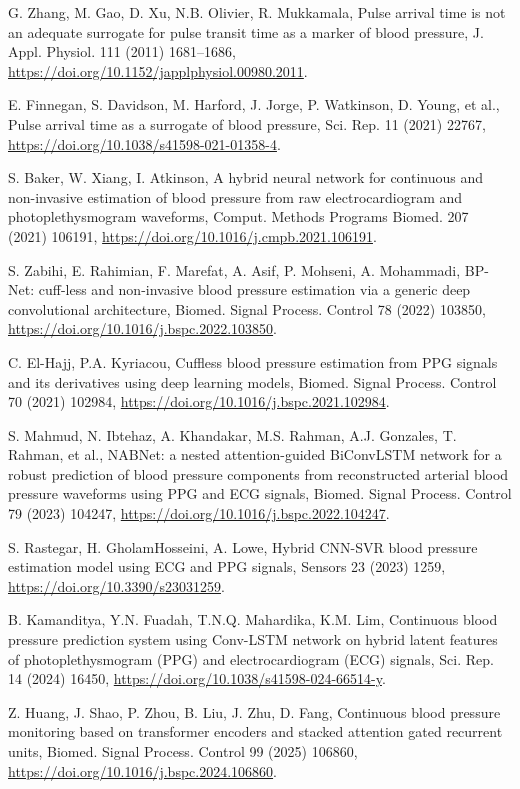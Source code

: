 \documentclass[preprint,12pt]{elsarticle}
\begin{document}
\begin{enumerate}[label={[\arabic*]},leftmargin=2.2em]
\item G. Zhang, M. Gao, D. Xu, N.B. Olivier, R. Mukkamala, Pulse arrival time is not an adequate surrogate for pulse transit time as a marker of blood pressure, J. Appl. Physiol. 111 (2011) 1681--1686, \url{https://doi.org/10.1152/japplphysiol.00980.2011}.
\item E. Finnegan, S. Davidson, M. Harford, J. Jorge, P. Watkinson, D. Young, et al., Pulse arrival time as a surrogate of blood pressure, Sci. Rep. 11 (2021) 22767, \url{https://doi.org/10.1038/s41598-021-01358-4}.
\item S. Baker, W. Xiang, I. Atkinson, A hybrid neural network for continuous and non-invasive estimation of blood pressure from raw electrocardiogram and photoplethysmogram waveforms, Comput. Methods Programs Biomed. 207 (2021) 106191, \url{https://doi.org/10.1016/j.cmpb.2021.106191}.
\item S. Zabihi, E. Rahimian, F. Marefat, A. Asif, P. Mohseni, A. Mohammadi, BP-Net: cuff-less and non-invasive blood pressure estimation via a generic deep convolutional architecture, Biomed. Signal Process. Control 78 (2022) 103850, \url{https://doi.org/10.1016/j.bspc.2022.103850}.
\item C. El-Hajj, P.A. Kyriacou, Cuffless blood pressure estimation from PPG signals and its derivatives using deep learning models, Biomed. Signal Process. Control 70 (2021) 102984, \url{https://doi.org/10.1016/j.bspc.2021.102984}.
\item S. Mahmud, N. Ibtehaz, A. Khandakar, M.S. Rahman, A.J. Gonzales, T. Rahman, et al., NABNet: a nested attention-guided BiConvLSTM network for a robust prediction of blood pressure components from reconstructed arterial blood pressure waveforms using PPG and ECG signals, Biomed. Signal Process. Control 79 (2023) 104247, \url{https://doi.org/10.1016/j.bspc.2022.104247}.
\item S. Rastegar, H. GholamHosseini, A. Lowe, Hybrid CNN-SVR blood pressure estimation model using ECG and PPG signals, Sensors 23 (2023) 1259, \url{https://doi.org/10.3390/s23031259}.
\item B. Kamanditya, Y.N. Fuadah, T.N.Q. Mahardika, K.M. Lim, Continuous blood pressure prediction system using Conv-LSTM network on hybrid latent features of photoplethysmogram (PPG) and electrocardiogram (ECG) signals, Sci. Rep. 14 (2024) 16450, \url{https://doi.org/10.1038/s41598-024-66514-y}.
\item Z. Huang, J. Shao, P. Zhou, B. Liu, J. Zhu, D. Fang, Continuous blood pressure monitoring based on transformer encoders and stacked attention gated recurrent units, Biomed. Signal Process. Control 99 (2025) 106860, \url{https://doi.org/10.1016/j.bspc.2024.106860}.

\end{enumerate}
\end{document}
